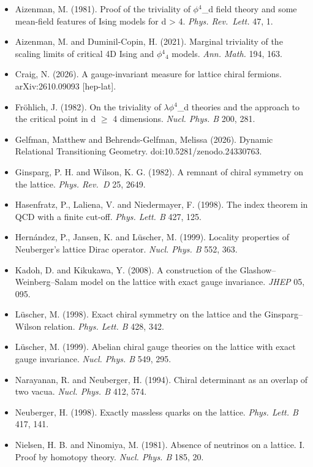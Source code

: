 \documentclass[
  11pt,
]{article}
\providecommand{\tightlist}{%
  \setlength{\itemsep}{0pt}\setlength{\parskip}{0pt}}
\begin{document}
\begin{itemize}
\tightlist
\item
  Aizenman, M. (1981). Proof of the triviality of \ensuremath{\phi}\ensuremath{^{4}}\_d field theory and some mean-field features of Ising models for d \textgreater{} 4. \emph{Phys. Rev.~Lett.} 47, 1.
\item
  Aizenman, M. and Duminil-Copin, H. (2021). Marginal triviality of the scaling limits of critical 4D Ising and \ensuremath{\phi}\ensuremath{^{4}}\ensuremath{_{4}} models. \emph{Ann. Math.} 194, 163.
\item
  Craig, N. (2026). A gauge-invariant measure for lattice chiral fermions. arXiv:2610.09093 {[}hep-lat{]}.
\item
  Fröhlich, J. (1982). On the triviality of \ensuremath{\lambda}\ensuremath{\phi}\ensuremath{^{4}}\_d theories and the approach to the critical point in d \ensuremath{\ge} 4 dimensions. \emph{Nucl. Phys. B} 200, 281.
\item
  Gelfman, Matthew and Behrends-Gelfman, Melissa (2026). Dynamic Relational Transitioning Geometry. doi:10.5281/zenodo.24330763.
\item
  Ginsparg, P. H. and Wilson, K. G. (1982). A remnant of chiral symmetry on the lattice. \emph{Phys. Rev.~D} 25, 2649.
\item
  Hasenfratz, P., Laliena, V. and Niedermayer, F. (1998). The index theorem in QCD with a finite cut-off. \emph{Phys. Lett. B} 427, 125.
\item
  Hernández, P., Jansen, K. and Lüscher, M. (1999). Locality properties of Neuberger's lattice Dirac operator. \emph{Nucl. Phys. B} 552, 363.
\item
  Kadoh, D. and Kikukawa, Y. (2008). A construction of the Glashow--Weinberg--Salam model on the lattice with exact gauge invariance. \emph{JHEP} 05, 095.
\item
  Lüscher, M. (1998). Exact chiral symmetry on the lattice and the Ginsparg--Wilson relation. \emph{Phys. Lett. B} 428, 342.
\item
  Lüscher, M. (1999). Abelian chiral gauge theories on the lattice with exact gauge invariance. \emph{Nucl. Phys. B} 549, 295.
\item
  Narayanan, R. and Neuberger, H. (1994). Chiral determinant as an overlap of two vacua. \emph{Nucl. Phys. B} 412, 574.
\item
  Neuberger, H. (1998). Exactly massless quarks on the lattice. \emph{Phys. Lett. B} 417, 141.
\item
  Nielsen, H. B. and Ninomiya, M. (1981). Absence of neutrinos on a lattice. I. Proof by homotopy theory. \emph{Nucl. Phys. B} 185, 20.

\end{itemize}
\end{document}
